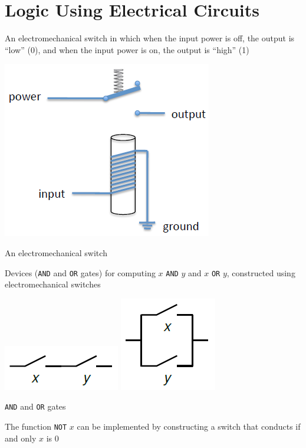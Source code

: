 \documentclass[8pt,a4paper,compress]{beamer}
\begin{document}
\section{Logic Using Electrical Circuits}
\begin{frame}[fragile]
An electromechanical switch in which when the input power is off, the output is ``low'' (0), and when the input power is on, the output is ``high'' (1)
\begin{center}
\includegraphics[scale=0.22]{figures/em_switch.png}

\smallskip

\tiny An electromechanical switch
\end{center}

\bigskip

Devices (\lstinline{AND} and \lstinline{OR} gates) for computing $x$ \lstinline{AND} $y$ and $x$ \lstinline{OR} $y$, constructed using electromechanical switches
\begin{center}
\includegraphics[scale=0.22]{figures/and_gate.png}\hspace{1cm} \includegraphics[scale=0.22]{figures/or_gate.png}

\smallskip

\tiny \lstinline{AND} and \lstinline{OR} gates
\end{center}

\bigskip

The function \lstinline{NOT} $x$ can be implemented by constructing a switch that conducts if and only $x$ is 0
\end{frame}
\end{document}
